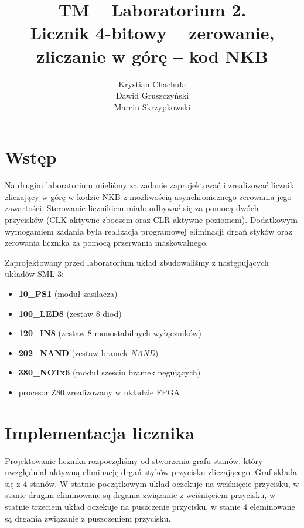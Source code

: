 \documentclass[fleqn]{article}
\title{TM -- Laboratorium 2. \\ \large Licznik 4-bitowy – zerowanie, zliczanie w górę – kod NKB}
\author{Krystian Chachuła \\ Dawid Gruszczyński \\ Marcin Skrzypkowski}
\begin{document}
\maketitle

\setcounter{page}{0}
\thispagestyle{empty}

\pagebreak

\setcounter{page}{1}

\section{Wstęp}

Na drugim laboratorium mieliśmy za zadanie zaprojektować i zrealizować licznik zliczający w górę w kodzie NKB z możliwością asynchronicznego zerowania jego zawartości.
Sterowanie licznikiem miało odbywać się za pomocą dwóch przycisków (CLK aktywne zboczem oraz CLR aktywne poziomem).
Dodatkowym wymogamiem zadania była realizacja programowej eliminacji drgań styków oraz zerowania licznika za pomocą przerwania maskowalnego.

Zaprojektowany przed laboratorium układ zbudowaliśmy z następujących układów SML-3:

\begin{itemize}
	\item \textbf{10\_PS1} (moduł zasilacza)
	\item \textbf{100\_LED8} (zestaw 8 diod)
	\item \textbf{120\_IN8} (zestaw 8 monostabilnych wyłączników)
	\item \textbf{202\_NAND} (zestaw bramek \textit{NAND})
	\item \textbf{380\_NOTx6} (moduł sześciu bramek negujących)
	\item procesor Z80 zrealizowany w układzie FPGA
\end{itemize}

\section{Implementacja licznika}

Projektowanie licznika rozpoczęliśmy od stworzenia grafu stanów, który uwzględniał aktywną eliminację drgań styków przycisku zliczającego.
Graf składa się z 4 stanów. W statnie początkowym układ oczekuje na wciśnięcie przycisku, w stanie drugim eliminowane są drgania związanie z wciśnięciem przycisku, w statnie trzeciem układ oczekuje na puszczenie przycisku, w stanie 4 eleminowane są drgania związanie z puszczeniem przycisku.
\end{document}

